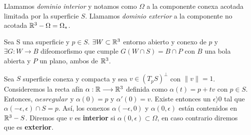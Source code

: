 \begin{definition}
Llamamos \textit{dominio interior} y notamos como $\Omega$ a la componente conexa acotada limitada por la superficie $S$. Llamamos \textit{dominio exterior} a la componente no acotada $\mathbb{R}^3 - \Omega=\Omega_{*}$.
\end{definition}

\begin{lemma}
Sea S una superficie y $p \in S$. $\exists W \subset \mathbb{R}^3$ entorno abierto y conexo de $p$ y $\exists G: W \longrightarrow B$ difeomorfismo que cumple $G(W\cap S) = B\cap P$ con $B$ una bola abierta y $P$ un plano, ambos de $\mathbb{R}^3$.
\end{lemma}

\begin{definition}
Sea $S$ superficie conexa y compacta y sea $v \in (T_pS)^{\perp}$ con $\parallel v \parallel=1$. Consideremos la recta afín $\alpha: \mathbb{R} \longrightarrow \mathbb{R}^3$ definida como $\alpha(t) = p + tv$ con $p \in S$. Entonces, $\alpha es regular$ y $\alpha(0)=p$ y $\alpha'(0) = v$. Existe entonces un $\epsilon  \rangle  0$ tal que $\alpha(-\epsilon, \epsilon) \cap S = {p}$. Así, los conexos $\alpha(-\epsilon, 0)$ y $\alpha(0, \epsilon)$ están contenidos en $\mathbb{R}^3 - S$. Diremos que $v$ es \textbf{interior} si $\alpha(0, \epsilon) \subset \Omega$, en caso contrario diremos que es \textbf{exterior}. 
\end{definition}

